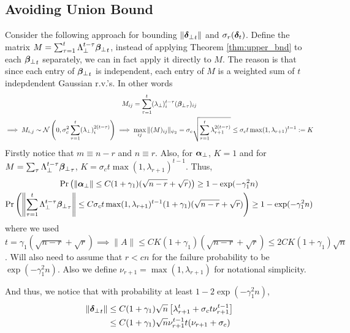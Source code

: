 \documentclass[10pt]{article}
\newcommand{\norm}[1]{\left\|#1\right\|}
\begin{document}
{\color{blue}
\subsection{Avoiding Union Bound}
Consider the following approach for bounding $\|{\bm{\delta}_{\perp}}_t\|$ and $\sigma_r(\bm{\delta}_t)$. Define the matrix 
$M = \sum_{\tau=1}^t \Lambda_\perp^{t-\tau}  {\bm{\beta}_{\perp}}_t$, instead of applying Theorem \ref{thm:upper_bnd} to each ${\bm{\beta}_{\perp}}_t$ separately, we can in fact apply it directly to $M$. The reason is that since each entry of ${\bm{\beta}_{\perp}}_t$ is independent, each entry of $M$ is a weighted sum of $t$ indepdendent Gaussian r.v.'s. In other words
\begin{gather*}
M_{ij} = \sum_{\tau=1}^t (\lambda_\perp)_i^{t-\tau} ({\bm{\beta}_{\perp}}_{\tau})_{ij} \\
\implies M_{i,j} \sim \mathcal{N}\left(0, \sigma_c^2 \sum_{\tau=1}^t (\lambda_\perp)_i^{2(t-\tau)}\right)
\implies \max_{ij} \|(M)_{ij}\|_{\psi_2} = \sigma_c \sqrt{\sum_{\tau=1}^t \lambda_{r+1}^{2(t-\tau)}} \leq \sigma_c t \max(1, \lambda_{r+1})^{t-1} := K
\end{gather*}
Firstly notice that $m \equiv n-r$ and $n \equiv r$. Also, for $\bm{\alpha}_{\perp}$, $K = 1$ and for $M = \sum_{\tau} \Lambda_\perp^{t-\tau}{\bm{\beta}_{\perp}}_\tau$, $K = \sigma_c t \max(1, \lambda_{r+1})^{t-1}$. Thus, 
\begin{gather*}
\Pr\left(\|\usin\| \leq C (1 + \gamma_1)(\sqrt{n-r} + \sqrt{r})\right) \geq  1 - \exp(- \gamma_1^2 n) \\
\Pr\left(\norm{\sum_{\tau=1}^t \Lambda_\perp^{t-\tau} \wsin_\tau} \leq C \sigma_c t \max(1, \lambda_{r+1})^{t-1} (1 + \gamma_1)(\sqrt{n-r} + \sqrt{r}) \right) \geq  1 - \exp(- \gamma_1^2 n)
\end{gather*}
where we used $t = \gamma_1 (\sqrt{n-r} + \sqrt{r}) \implies \|A\| \leq CK (1+ \gamma_1) (\sqrt{n-r} + \sqrt{r}) \leq 2CK (1+ \gamma_1) \sqrt{n}$. Will also need to assume that $r < cn$ for the failure probability to be $\exp(-\gamma_1^2 n)$. Also we define $\nu_{r+1} = \max(1, \lambda_{r+1})$ for notational simplicity. 

 And thus, we notice that with probability at least $1 - 2 \exp(- \gamma_1^2 n)$, 
\begin{align*}
\|{\bm{\delta}_{\perp}}_t\| &\leq C (1+ \gamma_1) \sqrt{n} \left[\lambda_{r+1}^t +  \sigma_c t \nu_{r+1}^{t-1}  \right] \\
&\leq C (1+ \gamma_1) \sqrt{n} \nu_{r+1}^{t-1} t (\nu_{r+1} + \sigma_c) \\
\end{align*}

}
\end{document}
